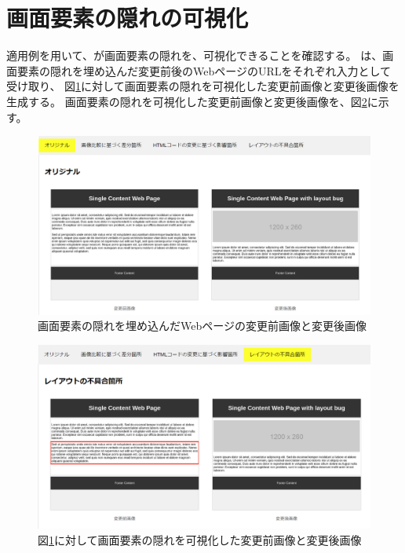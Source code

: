 \section{画面要素の隠れの可視化}\label{sec:result_area_detection}
適用例を用いて、\toolName が画面要素の隠れを、可視化できることを確認する。
\toolName は、画面要素の隠れを埋め込んだ変更前後のWebページのURLをそれぞれ入力として受け取り、
図\ref{fig: ex1_original}に対して画面要素の隠れを可視化した変更前画像と変更後画像を生成する。
画面要素の隠れを可視化した変更前画像と変更後画像を、図\ref{fig: ex1_subeffect}に示す。
\begin{figure}[tp]
    \begin{center}
        \includegraphics[width=1.0\columnwidth]{image/5/ex1_original.png}
        \caption{画面要素の隠れを埋め込んだWebページの変更前画像と変更後画像}
        \label{fig: ex1_original}
    \end{center}
\end{figure}
\par
\begin{figure}[tp]
    \begin{center}
        \includegraphics[width=1.0\columnwidth]{image/5/ex1_subeffect.png}
        \caption{図\ref{fig: ex1_original}に対して画面要素の隠れを可視化した変更前画像と変更後画像}
        \label{fig: ex1_subeffect}
    \end{center}
\end{figure}
